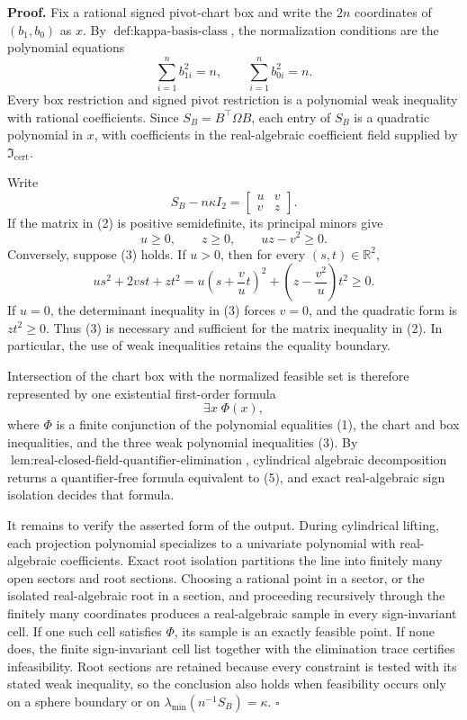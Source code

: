 \textbf{Proof.}
Fix a rational signed pivot-chart box and write the \(2n\) coordinates of \((b_1,b_0)\) as \(x\).  By \(\operatorname{def{:}kappa\mbox{-}basis\mbox{-}class}\), the normalization conditions are the polynomial equations
\[
\sum_{i=1}^n b_{1i}^2=n,
\qquad
\sum_{i=1}^n b_{0i}^2=n.
\tag{1}
\]
Every box restriction and signed pivot restriction is a polynomial weak inequality with rational coefficients.  Since \(S_B=B^{\top}\Omega B\), each entry of \(S_B\) is a quadratic polynomial in \(x\), with coefficients in the real-algebraic coefficient field supplied by \(\mathfrak I_{\mathrm{cert}}\).

Write
\[
S_B-n\kappa I_2=
\begin{bmatrix}u&v\\v&z\end{bmatrix}.
\tag{2}
\]
If the matrix in (2) is positive semidefinite, its principal minors give
\[
u\ge0,
\qquad z\ge0,
\qquad uz-v^2\ge0.
\tag{3}
\]
Conversely, suppose (3) holds.  If \(u>0\), then for every \((s,t)\in\mathbb R^2\),
\[
us^2+2vst+zt^2
=u\left(s+\frac vu t\right)^2
+\left(z-\frac{v^2}{u}\right)t^2\ge0.
\tag{4}
\]
If \(u=0\), the determinant inequality in (3) forces \(v=0\), and the quadratic form is \(zt^2\ge0\).  Thus (3) is necessary and sufficient for the matrix inequality in (2).  In particular, the use of weak inequalities retains the equality boundary.

Intersection of the chart box with the normalized feasible set is therefore represented by one existential first-order formula
\[
\exists x\;\Phi(x),
\tag{5}
\]
where \(\Phi\) is a finite conjunction of the polynomial equalities (1), the chart and box inequalities, and the three weak polynomial inequalities (3).  By \(\operatorname{lem{:}real\mbox{-}closed\mbox{-}field\mbox{-}quantifier\mbox{-}elimination}\), cylindrical algebraic decomposition returns a quantifier-free formula equivalent to (5), and exact real-algebraic sign isolation decides that formula.

It remains to verify the asserted form of the output.  During cylindrical lifting, each projection polynomial specializes to a univariate polynomial with real-algebraic coefficients.  Exact root isolation partitions the line into finitely many open sectors and root sections.  Choosing a rational point in a sector, or the isolated real-algebraic root in a section, and proceeding recursively through the finitely many coordinates produces a real-algebraic sample in every sign-invariant cell.  If one such cell satisfies \(\Phi\), its sample is an exactly feasible point.  If none does, the finite sign-invariant cell list together with the elimination trace certifies infeasibility.  Root sections are retained because every constraint is tested with its stated weak inequality, so the conclusion also holds when feasibility occurs only on a sphere boundary or on \(\lambda_{\min}(n^{-1}S_B)=\kappa\). \(\square\)